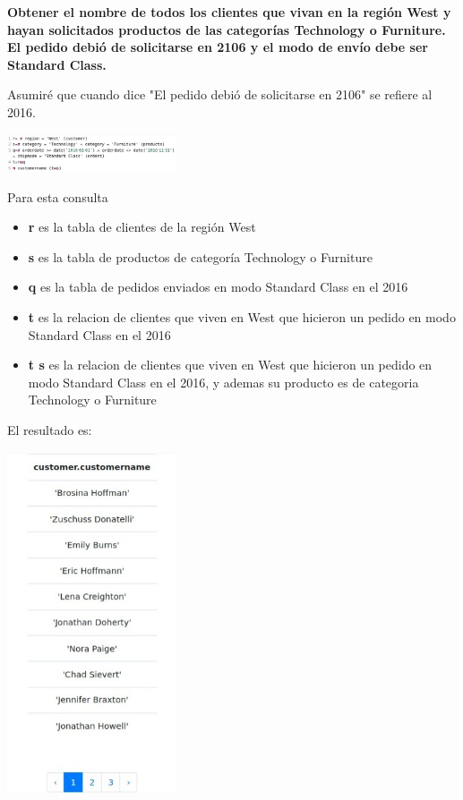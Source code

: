 \textbf{Obtener el nombre de todos los clientes que vivan en la región West y hayan solicitados productos de las categorías Technology o Furniture. El pedido debió de solicitarse en 2106 y el modo de envío debe ser Standard Class.}

Asumiré que cuando dice "El pedido debió de solicitarse en 2106" se refiere al 2016. 

\begin{center}
    \includegraphics[width=5cm]{resources/pregunta2/2.3.1}
\end{center}
Para esta consulta 
\begin{itemize}
    \item \textbf{r} es la tabla de clientes de la región West
    \item \textbf{s} es la tabla de productos de categoría Technology o Furniture
    \item \textbf{q} es la tabla de pedidos enviados en modo Standard Class en el 2016
    \item \textbf{t} es la relacion de clientes que viven en West que hicieron un pedido en modo Standard Class en el 2016
    \item \textbf{t \join s} es la relacion de clientes que viven en West que hicieron un pedido en modo Standard Class en el 2016, y ademas su producto es de categoria Technology o Furniture
\end{itemize}

El resultado es:
\begin{center}
    \includegraphics[width=5cm]{resources/pregunta2/2.3.2}
\end{center}

